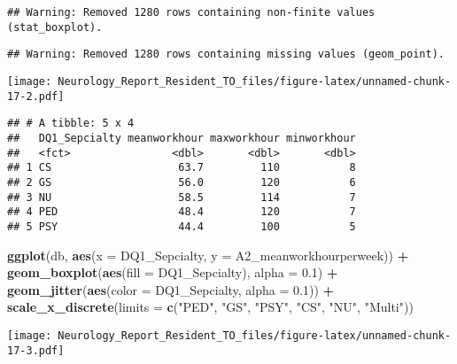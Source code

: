 \documentclass[]{book}
\newenvironment{Shaded}{\begin{snugshade}}{\end{snugshade}}
\newcommand{\DataTypeTok}[1]{\textcolor[rgb]{0.13,0.29,0.53}{#1}}
\newcommand{\FloatTok}[1]{\textcolor[rgb]{0.00,0.00,0.81}{#1}}
\newcommand{\KeywordTok}[1]{\textcolor[rgb]{0.13,0.29,0.53}{\textbf{#1}}}
\newcommand{\NormalTok}[1]{#1}
\newcommand{\OperatorTok}[1]{\textcolor[rgb]{0.81,0.36,0.00}{\textbf{#1}}}
\newcommand{\StringTok}[1]{\textcolor[rgb]{0.31,0.60,0.02}{#1}}
\begin{document}
\begin{verbatim}
## Warning: Removed 1280 rows containing non-finite values (stat_boxplot).
\end{verbatim}

\begin{verbatim}
## Warning: Removed 1280 rows containing missing values (geom_point).
\end{verbatim}

\texttt{[image: Neurology\_Report\_Resident\_TO\_files/figure-latex/unnamed-chunk-17-2.pdf]}

\begin{Shaded}
\end{Shaded}

\begin{verbatim}
## # A tibble: 5 x 4
##   DQ1_Sepcialty meanworkhour maxworkhour minworkhour
##   <fct>                <dbl>       <dbl>       <dbl>
## 1 CS                    63.7         110           8
## 2 GS                    56.0         120           6
## 3 NU                    58.5         114           7
## 4 PED                   48.4         120           7
## 5 PSY                   44.4         100           5
\end{verbatim}

\begin{Shaded}
\begin{Highlighting}[]
\KeywordTok{ggplot}\NormalTok{(db, }\KeywordTok{aes}\NormalTok{(}\DataTypeTok{x =}\NormalTok{ DQ1_Sepcialty, }\DataTypeTok{y =}\NormalTok{ A2_meanworkhourperweek)) }\OperatorTok{+}
\StringTok{  }\KeywordTok{geom_boxplot}\NormalTok{(}\KeywordTok{aes}\NormalTok{(}\DataTypeTok{fill =}\NormalTok{ DQ1_Sepcialty), }\DataTypeTok{alpha =} \FloatTok{0.1}\NormalTok{) }\OperatorTok{+}\StringTok{ }
\StringTok{  }\KeywordTok{geom_jitter}\NormalTok{(}\KeywordTok{aes}\NormalTok{(}\DataTypeTok{color =}\NormalTok{ DQ1_Sepcialty, }\DataTypeTok{alpha =} \FloatTok{0.1}\NormalTok{)) }\OperatorTok{+}
\StringTok{  }\KeywordTok{scale_x_discrete}\NormalTok{(}\DataTypeTok{limits =} \KeywordTok{c}\NormalTok{(}\StringTok{"PED"}\NormalTok{, }\StringTok{"GS"}\NormalTok{, }\StringTok{"PSY"}\NormalTok{, }\StringTok{"CS"}\NormalTok{, }\StringTok{"NU"}\NormalTok{, }\StringTok{"Multi"}\NormalTok{))}
\end{Highlighting}
\end{Shaded}

\texttt{[image: Neurology\_Report\_Resident\_TO\_files/figure-latex/unnamed-chunk-17-3.pdf]}


\end{document}
